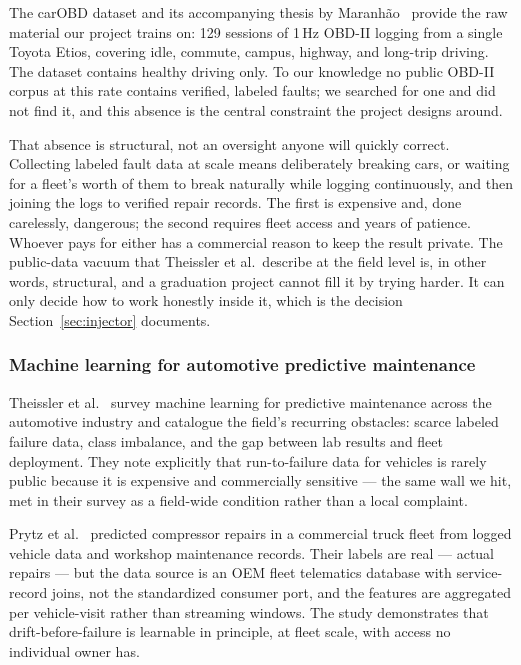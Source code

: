 The carOBD dataset and its accompanying thesis by
Maranh\~ao~\cite{maranhao_carobd} provide the raw material our project
trains on: 129 sessions of 1\,Hz OBD-II logging from a single Toyota Etios,
covering idle, commute, campus, highway, and long-trip driving. The dataset
contains healthy driving only. To our knowledge no public OBD-II corpus at
this rate contains verified, labeled faults; we searched for one and did not
find it, and this absence is the central constraint the project designs
around.

That absence is structural, not an oversight anyone will quickly correct.
Collecting labeled fault data at scale means deliberately breaking cars, or
waiting for a fleet's worth of them to break naturally while logging
continuously, and then joining the logs to verified repair records. The first is expensive and, done carelessly,
dangerous; the second requires fleet access and years of patience. Whoever
pays for either has a commercial reason to keep the result private. The
public-data vacuum that Theissler et al.\ describe at the field level is, in
other words, structural, and a graduation project cannot fill it by trying
harder. It can only decide how to work honestly inside it, which is the
decision Section~\ref{sec:injector} documents.

\subsubsection{Machine learning for automotive predictive maintenance}

Theissler et al.~\cite{theissler2021} survey machine learning for predictive
maintenance across the automotive industry and catalogue the field's
recurring obstacles: scarce labeled failure data, class imbalance, and the
gap between lab results and fleet deployment. They note explicitly that
run-to-failure data for vehicles is rarely public because it is expensive
and commercially sensitive --- the same wall we hit, met in their survey as
a field-wide condition rather than a local complaint.

Prytz et al.~\cite{prytz2015} predicted compressor repairs in a commercial
truck fleet from logged vehicle data and workshop maintenance records. Their
labels are real --- actual repairs --- but the data source is an OEM fleet
telematics database with service-record joins, not the standardized consumer
port, and the features are aggregated per vehicle-visit rather than
streaming windows. The study demonstrates that drift-before-failure is
learnable in principle, at fleet scale, with access no individual owner has.

